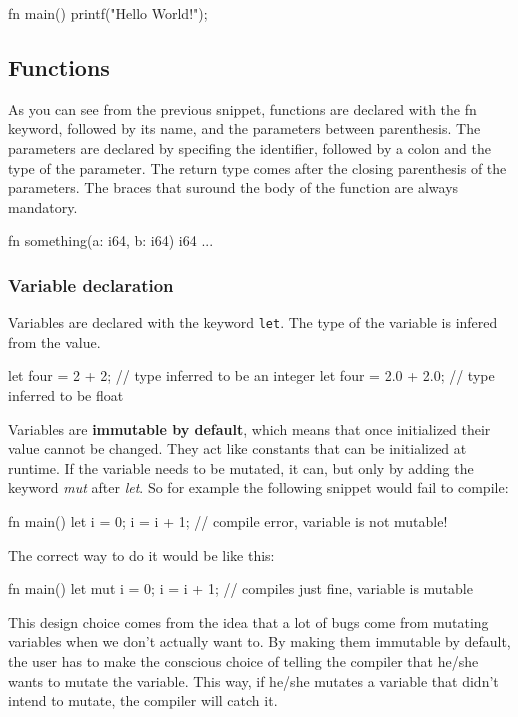 ﻿\documentclass[10pt,a4paper,twocolumn,twoside]{article}
\begin{document}
\begin{code}
fn main() {
    printf("Hello World!\n");
}
\end{code}

\subsection{Functions}
As you can see from the previous snippet, functions are declared with the fn
keyword, followed by its name, and  the parameters between parenthesis. The
parameters are declared by specifing the identifier, followed by a colon and the
type of the parameter. The return type comes after the closing parenthesis of
the parameters. The braces that suround the body of the function are always
mandatory.

\begin{code}
    fn something(a: i64, b: i64) i64 { ... }
\end{code}

\subsubsection{Variable declaration}
Variables are declared with the keyword \texttt{let}. The type of the variable
is infered from the value.

\begin{code}
let four = 2 + 2; // type inferred to be an integer
let four = 2.0 + 2.0; // type inferred to be float
\end{code}

Variables are \textbf{immutable by default}, which means that once initialized
their value cannot be changed. They act like constants that can be initialized
at runtime. If the variable needs to be mutated, it can, but only by adding the
keyword \textit{mut} after \textit{let}. So for example the following snippet
would fail to compile:

\begin{code}
    fn main() {
        let i = 0;
        i = i + 1; // compile error, variable is not mutable!
    }
\end{code}

The correct way to do it would be like this:

\begin{code}
    fn main() {
        let mut i = 0;
        i = i + 1; // compiles just fine, variable is mutable
    }
\end{code}

This design choice comes from the idea that a lot of bugs come from 
mutating variables when we don't actually want to. By making them immutable by
default, the user has to make the conscious choice of telling the compiler that
he/she wants to mutate the variable. This way, if he/she mutates a variable that
didn't intend to mutate, the compiler will catch it.
\end{document}

